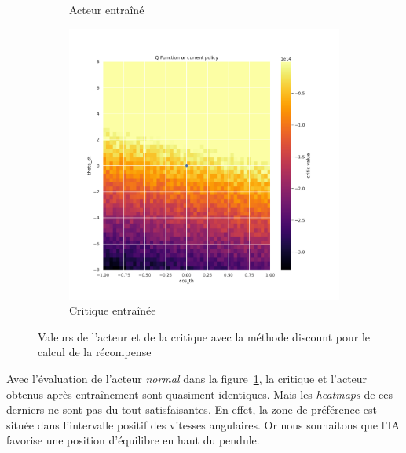 \begin{figure}[H]
\begin{subfigure}{0.3\textwidth}
        \caption{Acteur entraîné}
    \end{subfigure}
    \begin{subfigure}{0.3\textwidth}
        \includegraphics[width=\textwidth]{figures/iteration1/0_critic_discount_post_Pendulum-v0.pdf}
        \caption{Critique entraînée}
    \end{subfigure}
    \caption{Valeurs de l'acteur et de la critique avec la méthode discount pour le calcul de la récompense}
    \label{fig:attempt1_disount}
\end{figure}

Avec l'évaluation de l'acteur \emph{normal} dans la figure~\ref{fig:attempt1_disount}, la critique et l'acteur obtenus après entraînement sont quasiment identiques. Mais les \emph{heatmaps} de ces derniers ne sont pas du tout satisfaisantes. En effet, la zone de préférence est située dans l'intervalle positif des vitesses angulaires. Or nous souhaitons que l'IA favorise une position d'équilibre en haut du pendule.

